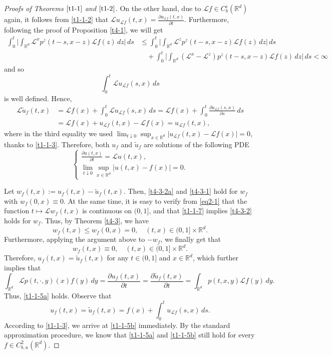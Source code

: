 \documentclass[a4paper,11pt]{amsart}
\renewcommand{\le}{\leqslant}
\newcommand{\R}{\mathds R}
\def\LL{{\mathcal L}}
\theoremstyle{definition}
\begin{document}
\begin{proof}[Proofs of Theorems $\ref{t1-1}$ and $\ref{t1-2}$]
On the other hand, due to $\LL f \in C_{b}^{\varepsilon}(\R^d)$ again, it follows from \eqref{t1-1-2} that
$ \LL u_{\LL f}(t,x)=\frac{\partial u_{\LL f}(t,x)}{\partial t}$. Furthermore, following the
proof of Proposition \ref{t4-1}, we will get
\begin{align*}
\int_0^t \Big|\int_{\R^d} \LL^x p^z(t-s,x-z)\LL f(z)\,dz\Big|\,ds
&\le \int_0^t \Big|\int_{\R^d} \LL^z p^z(t-s,x-z)\LL f(z)\,dz\Big|\,ds\\
&\quad +\int_0^t \Big|\int_{\R^d}( \LL^x- \LL^z) p^z(t-s,x-z)\LL f(z)\,dz\Big|\,ds<\infty
\end{align*} and so $$\int_0^t \LL u_{\LL f}(s,x)\,ds$$ is well defined.
Hence,
\begin{align*}
\LL\tilde u_f(t,x)&=\LL f(x)+\int_0^t
 \LL u_{\LL f}(s,x)\,ds=\LL f(x)+\int_0^t \frac{\partial u_{\LL f}(s,x)}{\partial s}\,ds\\
&=\LL f(x)+u_{\LL f}(t,x)-\LL f(x)=u_{\LL f}(t,x),
\end{align*}
where in the third equality we used
$\lim_{t \downarrow 0}\sup_{x\in\R^d}|u_{\LL f}(t,x)-\LL f(x)|=0$, thanks to \eqref{t1-1-3}.
Therefore, both $u_f$ and $\tilde u_f$ are solutions of the following PDE
\begin{equation}\label{t1-1-11}
\begin{cases}
\frac{\partial u(t,x)}{\partial t}= \LL u(t,x),\\
\lim_{t \downarrow 0}\sup_{x \in \R^d}|u(t,x)-f(x)|=0.
\end{cases}
\end{equation}

Let $w_f(t,x):=u_f(t,x)-\tilde u_f(t,x)$. Then,  \eqref{t4-3-2a} and \eqref{t4-3-1} hold for $w_f$ with $w_f(0,x)\equiv 0$. At the same time, it is easy to verify from \eqref{eq2-1}
that the function $t \mapsto \LL w_f(t,x)$ is continuous on $(0,1]$, and that
\eqref{t1-1-7} implies \eqref{t4-3-2} holds for $w_f$. Thus, by Theorem \ref{t4-3}, we have
\begin{equation*}
w_f(t,x)\le w_f(0,x)=0,\quad (t,x)\in (0,1]\times \R^d.
\end{equation*}
Furthermore, applying the argument above to $-w_f$, we finally get that \begin{equation*}
w_f(t,x)\equiv 0,\quad  (t,x)\in (0,1]\times \R^d.
\end{equation*}
Therefore, $u_f(t,x)=\tilde u_f(t,x)$ for any $t \in (0,1]$ and $x \in \R^d$, which further implies that
\begin{equation*}
\int_{\R^d} \LL p(t,\cdot,y)(x)f(y)\,dy=\frac{\partial u_f(t,x)}{\partial t}
=\frac{\partial \tilde u_{f}(t,x)}{\partial t}=\int_{\R^d}p(t,x,y)\LL f(y)\,dy.
\end{equation*}
Thus, \eqref{t1-1-5a} holds. Observe that
\begin{equation*}
u_f(t,x)=\tilde u_f(t,x)=f(x)+\int_0^t u_{\LL f}(s,x)\,ds.
\end{equation*}
According to \eqref{t1-1-3}, we arrive at \eqref{t1-1-5b} immediately.
By the standard approximation procedure, we know that \eqref{t1-1-5a} and
\eqref{t1-1-5b} still hold for every $f \in C_{b,u}^2(\R^d)$.


\end{proof}
\end{document}
